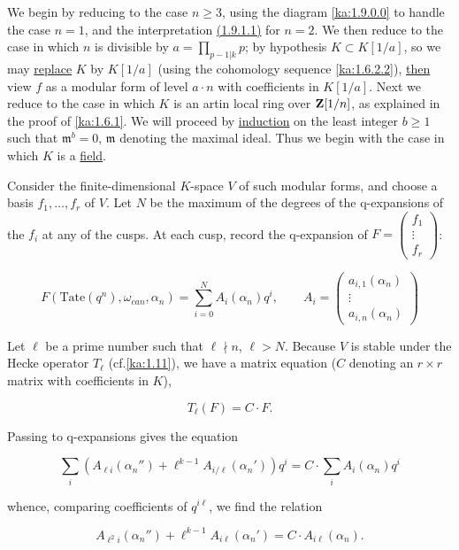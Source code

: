 \begin{kaproof}
We begin by reducing to the case $n\geq 3$, using the diagram \eqref{ka:1.9.0.0} to
handle the case $n=1$, and the interpretation \hyperref[ka:1.9.0.1]{(1.9.1.1)} for $n=2$. We then
reduce to the case in which $n$ is divisible by $a = \prod_{p-1|k}p$; by
hypothesis $K\subset K[1/a]$, so we may \uline{replace} $K$ by $K[1/a]$ (using
the cohomology sequence \eqref{ka:1.6.2.2}), \uline{then} view $f$ as a modular form of
level $a\cdot n$ with coefficients in $K[1/a]$. Next we reduce to the case in
which $K$ is an artin local ring over $\mathbf{Z}[1/n]$, as explained in the proof of
\eqref{ka:1.6.1}. We will proceed by \uline{induction} on the least integer $b\geq 1$
such that $\mathfrak{m}^b = 0$, $\mathfrak{m}$ denoting the maximal ideal. Thus we begin with the
case in which $K$ is a \uline{field}.

Consider the finite-dimensional $K$-space $V$ of such modular forms, and choose
a basis $f_1,\ldots,f_r$ of $V$. Let $N$ be the maximum of the degrees of the
q-expansions of the $f_i$ at any of the cusps. At each cusp, record the
q-expansion of $F = \begin{pmatrix}f_1\\\vdots\\f_r\end{pmatrix}$:

\[
F(\mathrm{Tate}(q^n),\omega_{can},\alpha_n) = \sum_{i=0}^N A_i(\alpha_n)q^i, \qquad A_i = \begin{pmatrix}a_{i,1}(\alpha_n)\\\vdots\\a_{i,n}(\alpha_n)\end{pmatrix}
\]

Let $\ell$ be a prime number such that $\ell\nmid n$, $\ell > N$. Because $V$ is
stable under the Hecke operator $T_\ell$ (cf.\ref{ka:1.11}), we have a matrix equation
($C$ denoting an $r\times r$ matrix with coefficients in $K$),

\[
T_\ell(F) = C\cdot F.
\]

Passing to q-expansions gives the equation

\[
\sum_i(A_{\ell i}(\alpha_n'') + \ell^{k-1}A_{i/\ell}(\alpha_n'))q^i = C\cdot\sum_i A_i(\alpha_n)q^i
\]

whence, comparing coefficients of $q^{i\ell}$, we find the relation

\[
A_{\ell^2i}(\alpha_n'') + \ell^{k-1}A_{i\ell}(\alpha_n') = C\cdot A_{i\ell}(\alpha_n).
\]


\end{kaproof}
